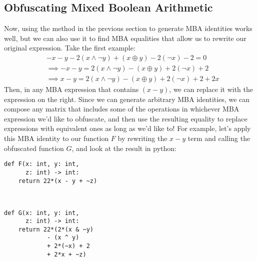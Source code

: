 \subsection{Obfuscating Mixed Boolean Arithmetic}
Now, using the method in the previous section to generate MBA identities works well,
but we can also use it to find MBA equalities that allow us to rewrite our original
expression. Take the first example:
\begin{align*} 
    &  - x - y - 2(x \land \neg y) + (x \oplus y) - 2(\neg x) - 2 = 0\\
    &\implies - x - y = 2(x \land \neg y) - (x \oplus y) + 2(\neg x) + 2\\
    &\implies x - y = 2(x \land \neg y) - (x \oplus y) + 2(\neg x) + 2 + 2x
\end{align*}
Then, in any MBA expression that contains $(x - y)$, we can replace it with
the expression on the right. Since we can generate arbitrary MBA identities, 
we can compose any matrix that includes some of the operations in whichever
MBA expression we'd like to obfuscate, and then use the resulting equality
to replace expressions with equivalent ones as long as we'd like to! For example, let's
apply this MBA identity to our function $F$ by rewriting the $x-y$ term and calling
the obfuscated function $G$, and look at
the result in python:
\\
\begin{minipage}{.5\textwidth}
    \begin{small}
    \begin{framed}
        \begin{verbatim}
def F(x: int, y: int,
      z: int) -> int:
    return 22*(x - y + ~z)



        \end{verbatim}
    \end{framed}
    \end{small}
\end{minipage}%
\begin{minipage}{.5\textwidth}
    \begin{framed}
        \begin{small}
        \begin{verbatim}
def G(x: int, y: int,
      z: int) -> int:
    return 22*(2*(x & ~y) 
            - (x ^ y) 
            + 2*(~x) + 2
            + 2*x + ~z)
        \end{verbatim}
        \end{small}
    \end{framed}
\end{minipage}
